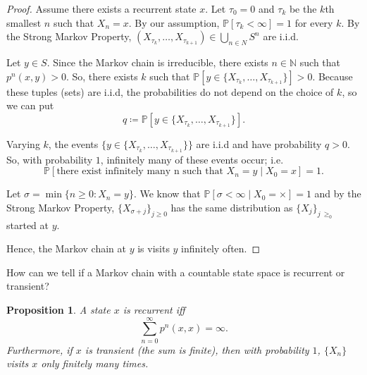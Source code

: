 \documentclass{tufte-handout}
\newcommand*\N{\mathbb{N}}
\renewcommand*\P{\mathbb{P}}
\newtheorem{prop}[thm]{Proposition}
\theoremstyle{definition}
\begin{document}
\begin{proof}
	Assume there exists a recurrent state $x$. Let $\tau_0 = 0$ and $\tau_k$ be the $k$th smallest $n$ such that $X_n = x$. By our assumption, $\P\left[\tau_k < \infty\right] = 1$ for every $k$. By the Strong Markov Property, $\left( X_{\tau_k},\ldots,X_{\tau_{k+1}} \right) \in \bigcup\limits_{n \in N}^{} S^{n}$ are i.i.d.

	Let $y \in S$. Since the Markov chain is irreducible, there exists $n \in \N$ such that $p^n(x,y) > 0$. So, there exists $k$ such that $\P\left[y \in \{X_{\tau_k}, \ldots,X_{\tau_{k+1}}\}\right] > 0$. Because these tuples (sets) are i.i.d, the probabilities do not depend on the choice of $k$, so we can put \[
		q \coloneqq \P\left[y \in \{X_{\tau_k},\ldots, X_{\tau_{k+1}}\}\right] 
	.\] 

	Varying $k$, the events $\{y \in \{X_{\tau_k}, \ldots,X_{\tau_{k+1}}\}\}$ are i.i.d and have probability $q > 0$. So, with probability $1$, infinitely many of these events occur; i.e. \[
		\P\left[\text{there exist infinitely many n such that } X_n = y \mid X_0 = x\right] = 1
	.\]

	Let $\sigma = \min \{n \ge 0: X_n = y\}$. We know that $\P\left[\sigma < \infty\mid X_0 = \times \right] = 1$ and by the Strong Markov Property, $\{X_{\sigma + j}\}_{j \ge 0}$ has the same distribution as $\{X_j\}_{j\ \ge_0}$ started at $y$.

	Hence, the Markov chain at $y$ is visits $y$ infinitely often.

\end{proof}

How can we tell if a Markov chain with a countable state space is recurrent or transient? 

\begin{prop}
	A state $x$ is recurrent iff \[
		\sum\limits_{n=0}^{\infty} p^n(x,x) = \infty
	.\] Furthermore, if $x$ is transient (the sum is finite), then with probability $1$, $\{X_n\}$ visits $x$ only finitely many times.
\end{prop}
\end{document}
